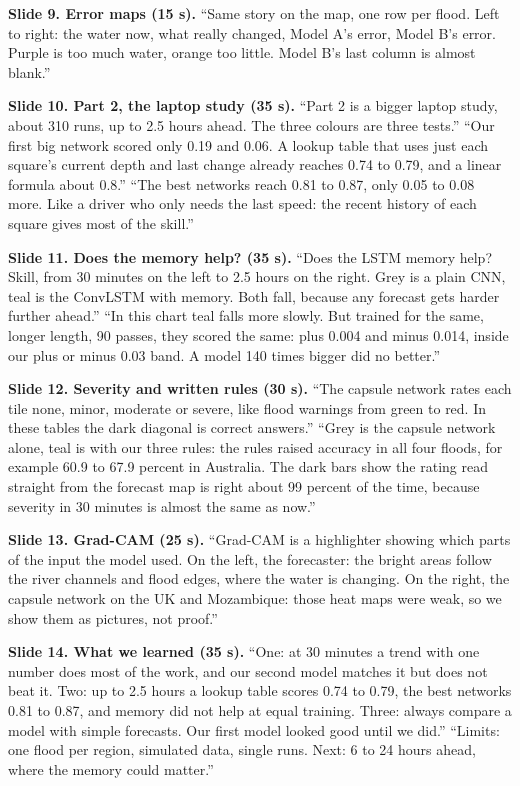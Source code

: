 \textbf{Slide 9. Error maps (15 s).}  ``Same story on the map, one row per flood. Left to right: the water now, what really changed, Model A's error, Model B's error. Purple is too much water, orange too little. Model B's last column is almost blank.''

\textbf{Slide 10. Part 2, the laptop study (35 s).}  ``Part 2 is a bigger laptop study, about 310 runs, up to 2.5 hours ahead. The three colours are three tests.''  ``Our first big network scored only 0.19 and 0.06. A lookup table that uses just each square's current depth and last change already reaches 0.74 to 0.79, and a linear formula about 0.8.''  ``The best networks reach 0.81 to 0.87, only 0.05 to 0.08 more. Like a driver who only needs the last speed: the recent history of each square gives most of the skill.''

\textbf{Slide 11. Does the memory help? (35 s).}  ``Does the LSTM memory help? Skill, from 30 minutes on the left to 2.5 hours on the right. Grey is a plain CNN, teal is the ConvLSTM with memory. Both fall, because any forecast gets harder further ahead.''  ``In this chart teal falls more slowly. But trained for the same, longer length, 90 passes, they scored the same: plus 0.004 and minus 0.014, inside our plus or minus 0.03 band. A model 140 times bigger did no better.''

\textbf{Slide 12. Severity and written rules (30 s).}  ``The capsule network rates each tile none, minor, moderate or severe, like flood warnings from green to red. In these tables the dark diagonal is correct answers.''  ``Grey is the capsule network alone, teal is with our three rules: the rules raised accuracy in all four floods, for example 60.9 to 67.9 percent in Australia. The dark bars show the rating read straight from the forecast map is right about 99 percent of the time, because severity in 30 minutes is almost the same as now.''

\textbf{Slide 13. Grad-CAM (25 s).}  ``Grad-CAM is a highlighter showing which parts of the input the model used. On the left, the forecaster: the bright areas follow the river channels and flood edges, where the water is changing. On the right, the capsule network on the UK and Mozambique: those heat maps were weak, so we show them as pictures, not proof.''

\textbf{Slide 14. What we learned (35 s).}  ``One: at 30 minutes a trend with one number does most of the work, and our second model matches it but does not beat it. Two: up to 2.5 hours a lookup table scores 0.74 to 0.79, the best networks 0.81 to 0.87, and memory did not help at equal training. Three: always compare a model with simple forecasts. Our first model looked good until we did.''  ``Limits: one flood per region, simulated data, single runs. Next: 6 to 24 hours ahead, where the memory could matter.''


